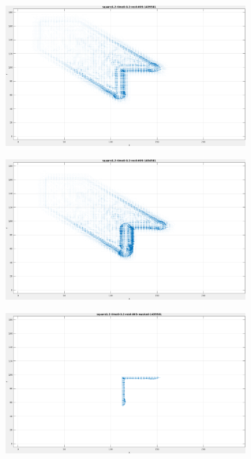\begin{figure}[tb]
\centering
\begin{subfigure}{.45\textwidth}
  \centering
  \includegraphics[height=.6\linewidth]{figs/square12/square12-1.png}
  \caption{}
\end{subfigure}
\begin{subfigure}{.45\textwidth}
  \centering
  \includegraphics[height=.6\linewidth]{figs/square12/square12-2.png}
  \caption{}
\end{subfigure}
\begin{subfigure}{.45\textwidth}
  \includegraphics[height=.6\linewidth]{figs/square12/square12-masked-1.png}

\end{subfigure}
\end{figure}
